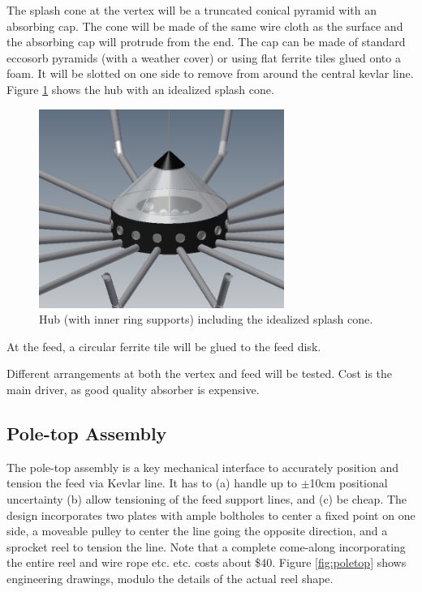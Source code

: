 \documentclass[11pt]{article}
\begin{document}
The splash cone at the vertex will be a truncated conical pyramid with an absorbing cap.  The cone will be made of the same wire cloth as the surface and the absorbing cap will protrude from the end.  The cap can be made of standard eccosorb pyramids (with a weather cover) or using flat ferrite tiles glued onto a foam.  It will be slotted on one side to remove from around the central kevlar line.  Figure \ref{fig:hubwithsplash} shows the hub with an idealized splash cone.
\begin{figure}[H]
\centering
\includegraphics[width=8cm]{hubwithsplash.png}
\caption{Hub (with inner ring supports) including the idealized splash cone.}
\label{fig:hubwithsplash}
\end{figure}

At the feed, a circular ferrite tile will be glued to the feed disk.

Different arrangements at both the vertex and feed will be tested.  Cost is the main driver, as good quality absorber is expensive.

\subsection{Pole-top Assembly}
The pole-top assembly is a key mechanical interface to accurately position and tension the feed via Kevlar line.  It has to (a) handle up to $\pm$10cm positional uncertainty (b) allow tensioning of the feed support lines, and (c) be cheap.  The design incorporates two plates with ample boltholes to center a fixed point on one side, a moveable pulley to center the line going the opposite direction, and a sprocket reel to tension the line.  Note that a complete come-along incorporating the entire reel and wire rope etc. etc. costs about \$40.  Figure \ref{fig:poletop} shows engineering drawings, modulo the details of the actual reel shape.
\end{document}

